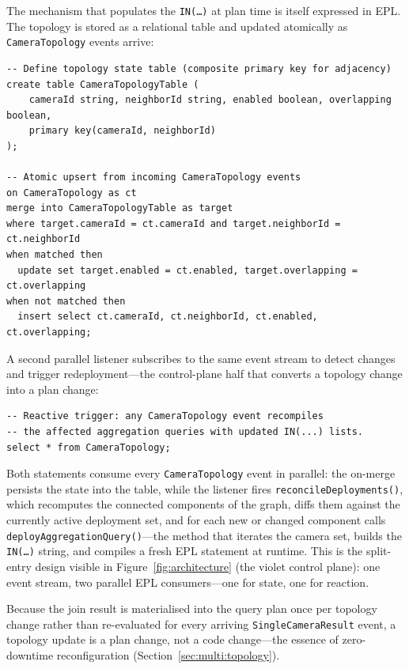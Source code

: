 \documentclass[review]{elsarticle}
\begin{document}
The mechanism that populates the \texttt{IN(\dots)} at plan time is itself expressed in EPL. The topology is stored as a relational table and updated atomically as \texttt{CameraTopology} events arrive:
\begin{verbatim}
-- Define topology state table (composite primary key for adjacency)
create table CameraTopologyTable (
    cameraId string, neighborId string, enabled boolean, overlapping boolean,
    primary key(cameraId, neighborId)
);

-- Atomic upsert from incoming CameraTopology events
on CameraTopology as ct
merge into CameraTopologyTable as target
where target.cameraId = ct.cameraId and target.neighborId = ct.neighborId
when matched then
  update set target.enabled = ct.enabled, target.overlapping = ct.overlapping
when not matched then
  insert select ct.cameraId, ct.neighborId, ct.enabled, ct.overlapping;
\end{verbatim}
A second parallel listener subscribes to the same event stream to detect changes and trigger redeployment---the control-plane half that converts a topology change into a plan change:
\begin{verbatim}
-- Reactive trigger: any CameraTopology event recompiles
-- the affected aggregation queries with updated IN(...) lists.
select * from CameraTopology;
\end{verbatim}
Both statements consume every \texttt{CameraTopology} event in parallel: the on-merge persists the state into the table, while the listener fires \texttt{reconcileDeployments()}, which recomputes the connected components of the graph, diffs them against the currently active deployment set, and for each new or changed component calls \texttt{deployAggregationQuery()}---the method that iterates the camera set, builds the \texttt{IN(\dots)} string, and compiles a fresh EPL statement at runtime. This is the split-entry design visible in Figure~\ref{fig:architecture} (the violet control plane): one event stream, two parallel EPL consumers---one for state, one for reaction.

Because the join result is materialised into the query plan once per topology change rather than re-evaluated for every arriving \texttt{SingleCameraResult} event, a topology update is a plan change, not a code change---the essence of zero-downtime reconfiguration (Section~\ref{sec:multi:topology}).

\end{document}
